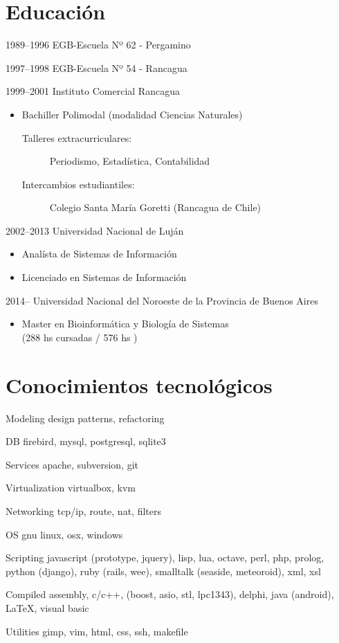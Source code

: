 \documentclass[a4paper]{article}
\begin{document}
\section{Educación}
\begin{CV}
\item[1989--1996] EGB-Escuela Nº 62 - Pergamino
\item[1997--1998] EGB-Escuela Nº 54 - Rancagua
\item[1999--2001] Instituto Comercial Rancagua
  \begin{itemize}
  \item Bachiller Polimodal (modalidad Ciencias Naturales)
  	\begin{description}
  	\item[Talleres extracurriculares: ] Periodismo, Estadística, Contabilidad
  	\item[Intercambios estudiantiles: ] Colegio Santa María Goretti (Rancagua de Chile)
  	\end{description}
  \end{itemize}
\item[2002--2013] Universidad Nacional de Luján
  \begin{itemize}
  \item Analísta de Sistemas de Información
  \item Licenciado en Sistemas de Información
  \end{itemize}
\item[2014--    ] Universidad Nacional del Noroeste de la Provincia de Buenos Aires
  \begin{itemize}
  \item Master en Bioinformática y Biología de Sistemas \\ (288 hs cursadas / 576 hs )
  \end{itemize}
\end{CV}

\section{Conocimientos tecnológicos}
\begin{CV}
\item[Modeling] design patterns, refactoring
\item[DB] firebird, mysql, postgresql, sqlite3
\item[Services] apache, subversion, git
\item[Virtualization] virtualbox, kvm
\item[Networking] tcp/ip, route, nat, filters
\item[OS] gnu linux, osx, windows
\item[Scripting] javascript (prototype, jquery), lisp, lua, octave, perl, php, prolog, python (django), ruby (rails, wee), smalltalk (seaside, meteoroid), xml, xsl
\item[Compiled] assembly, c/c++, (boost, asio, stl, lpc1343), delphi, java (android), \LaTeX, visual basic
\item[Utilities] gimp, vim, html, css, ssh, makefile
\end{CV}
\end{document}
